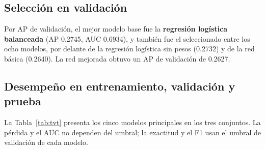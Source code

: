 \documentclass[12pt,a4paper]{article}
\begin{document}
\subsection{Selección en validación}

Por AP de validación, el mejor modelo base fue la \textbf{regresión logística balanceada} (AP 0.2745, AUC 0.6934), y también fue el seleccionado entre los ocho modelos, por delante de la regresión logística sin pesos (0.2732) y de la red básica (0.2640). La red mejorada obtuvo un AP de validación de 0.2627.

\subsection{Desempeño en entrenamiento, validación y prueba}

La Tabla~\ref{tab:tvt} presenta los cinco modelos principales en los tres conjuntos. La pérdida y el AUC no dependen del umbral; la exactitud y el F1 usan el umbral de validación de cada modelo.
\end{document}
